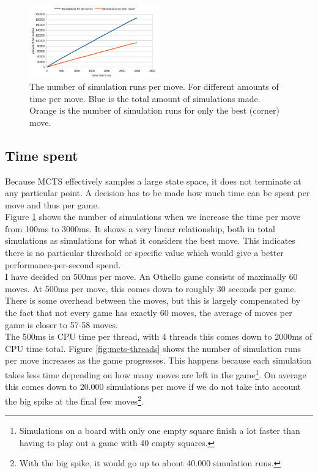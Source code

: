 \documentclass[11pt,a4paper]{article}
\begin{document}
\begin{figure}
	\centering
	\includegraphics[width=0.5\textwidth]{images/simulations-time}
	\caption{The number of simulation runs per move. For different amounts of time per move. Blue is the total amount of simulations made. Orange is the number of simulation runs for only the best (corner) move.}
	\label{fig:mcts-simulations-time}
\end{figure}

\subsection{Time spent}
Because MCTS effectively samples a large state space, it does not terminate at any particular point. A decision has to be made how much time can be spent per move and thus per game.\\

Figure \ref{fig:mcts-simulations-time} shows the number of simulations when we increase the time per move from 100ms to 3000ms. It shows a very linear relationship, both in total simulations as simulations for what it considers the best move. This indicates there is no particular threshold or specific value which would give a better performance-per-second spend.\\

I have decided on 500ms per move. An Othello game consists of maximally 60 moves. At 500ms per move, this comes down to roughly 30 seconds per game. There is some overhead between the moves, but this is largely compensated by the fact that not every game has exactly 60 moves, the average of moves per game is closer to 57-58 moves.\\

The 500ms is CPU time per thread, with 4 threads this comes down to 2000ms of CPU time total. Figure \ref{fig:mcts-threads} shows the number of simulation runs per move increases as the game progresses. This happens because each simulation takes less time depending on how many moves are left in the game\footnote{Simulations on a board with only one empty square finish a lot faster than having to play out a game with 40 empty squares.}. On average this comes down to 20.000 simulations per move if we do not take into account the big spike at the final few moves\footnote{With the big spike, it would go up to about 40.000 simulation runs.}.\\
\end{document}
